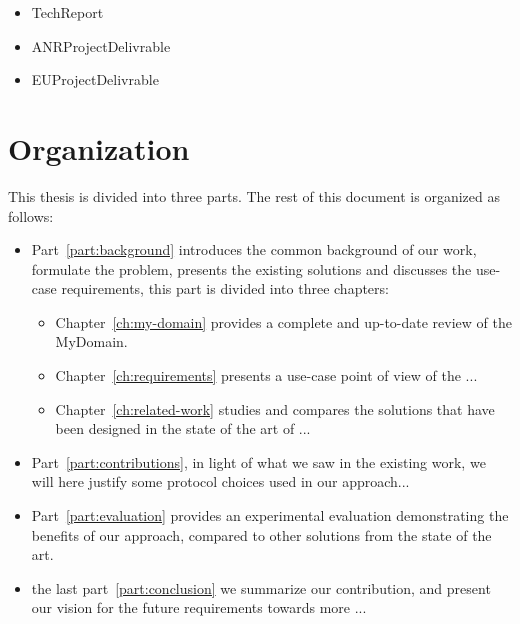 \begin{itemize}
  \item TechReport %
  \item ANRProjectDelivrable %
  \item EUProjectDelivrable %
\end{itemize}

\section{Organization}
\label{sec:intro:organisation}

This thesis is divided into three parts. 
The rest of this document is organized as follows:
\begin{itemize}
  \item Part~\ref{part:background} introduces the common background of our work,
  formulate the problem, presents the existing solutions and discusses the use-case
  requirements, this part is divided into three chapters:
  \begin{itemize}
    \item Chapter~\ref{ch:my-domain} provides a complete and up-to-date 
    review of the MyDomain.
    \item Chapter~\ref{ch:requirements} presents a use-case point of view of the
    ...
    \item Chapter~\ref{ch:related-work} studies and compares the solutions that have
    been designed in the state of the art of ...
  \end{itemize}
  \item Part~\ref{part:contributions}, in light of what we saw in the existing work, 
  we will here justify some protocol choices used in our approach...
  \item Part~\ref{part:evaluation} provides an experimental evaluation 
  demonstrating the benefits of our approach, compared to other solutions 
  from the state of the art.
  \item the last part~\ref{part:conclusion} we summarize our contribution, and 
  present our vision for the future requirements towards more ...
\end{itemize}
